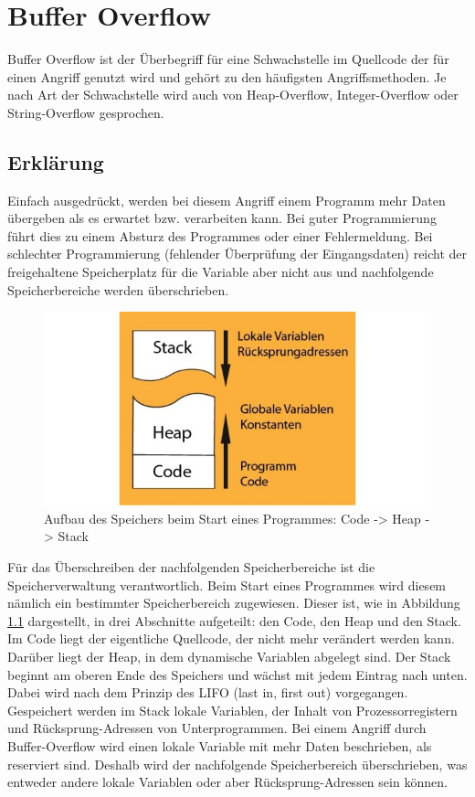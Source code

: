 \chapter{Buffer Overflow}
Buffer Overflow ist der Überbegriff für eine Schwachstelle im Quellcode der für einen Angriff genutzt wird und gehört zu den häufigsten Angriffsmethoden. Je nach Art der Schwachstelle wird auch von Heap-Overflow, Integer-Overflow oder String-Overflow gesprochen.
\section{Erklärung}
Einfach ausgedrückt, werden bei diesem Angriff einem Programm mehr Daten übergeben als es erwartet bzw. verarbeiten kann. Bei guter Programmierung führt dies zu einem Absturz des Programmes oder einer Fehlermeldung. Bei schlechter Programmierung (fehlender Überprüfung der Eingangsdaten) reicht der freigehaltene Speicherplatz für die Variable aber nicht aus und nachfolgende Speicherbereiche werden überschrieben.

\begin{figure}
	\centering
	\includegraphics[width=\textwidth]{images/BufferOverflow/speicherAufbau}
	\caption{Aufbau des Speichers beim Start eines Programmes: Code -> Heap -> Stack}
	\label{fig:speicherAufbau}
\end{figure}

Für das Überschreiben der nachfolgenden Speicherbereiche ist die Speicherverwaltung verantwortlich. Beim Start eines Programmes wird diesem nämlich ein bestimmter Speicherbereich zugewiesen. Dieser ist, wie in Abbildung \ref{fig:speicherAufbau} dargestellt, in drei Abschnitte aufgeteilt: den Code, den Heap und den Stack. \\
Im Code liegt der eigentliche Quellcode, der nicht mehr verändert werden kann. Darüber liegt der Heap, in dem dynamische Variablen abgelegt sind. Der Stack beginnt am oberen Ende des Speichers und wächst mit jedem Eintrag nach unten. Dabei wird nach dem Prinzip des LIFO (last in, first out) vorgegangen. Gespeichert werden im Stack lokale Variablen, der Inhalt von Prozessorregistern und Rücksprung-Adressen von Unterprogrammen. Bei einem Angriff durch Buffer-Overflow wird einen lokale Variable mit mehr Daten beschrieben, als reserviert sind. Deshalb wird der nachfolgende Speicherbereich überschrieben, was entweder andere lokale Variablen oder aber Rücksprung-Adressen sein können.

